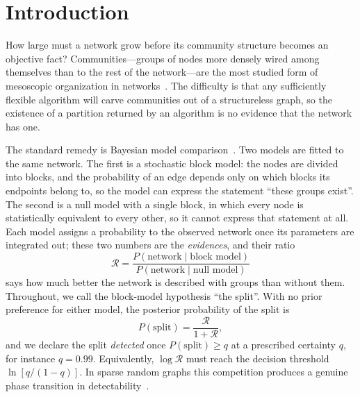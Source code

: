 \documentclass[preprint,12pt]{elsarticle}
\newcommand{\Rev}{\mathcal{R}}
\newcommand{\logR}{\log \Rev}
\begin{document}
\section{Introduction}
\label{sec:intro}

How large must a network grow before its community structure becomes an
objective fact? Communities---groups of nodes more densely wired among
themselves than to the rest of the network---are the most studied form of
mesoscopic organization in networks~\cite{fortunato2010,fortunato2016}. The
difficulty is that any sufficiently flexible algorithm will carve communities
out of a structureless graph, so the existence of a partition
returned by an algorithm is no evidence that the network has one.

The standard remedy is Bayesian model comparison~\cite{holland1983,karrer2011,
peixoto2017}. Two models are fitted to the same network. The first is a
stochastic block model: the nodes are divided into blocks, and the probability
of an edge depends only on which blocks its endpoints belong to, so the model
can express the statement ``these groups exist''. The second is a null model
with a single block, in which every node is statistically equivalent to every
other, so it cannot express that statement at all. Each model assigns a
probability to the observed network once its parameters are integrated out;
these two numbers are the \emph{evidences}, and their ratio
\begin{equation}
  \Rev = \frac{P(\text{network} \mid \text{block model})}
              {P(\text{network} \mid \text{null model})}
  \label{eq:R}
\end{equation}
says how much better the network is described with groups than without them.
Throughout, we call the block-model hypothesis ``the split''. With no prior
preference for either model, the posterior probability of the split is
\begin{equation}
  P(\text{split}) = \frac{\Rev}{1+\Rev},
  \label{eq:Psplit}
\end{equation}
and we declare the split \emph{detected} once $P(\text{split})\ge q$ at a
prescribed certainty $q$, for instance $q=0.99$. Equivalently, $\logR$ must
reach the decision threshold $\ln[q/(1-q)]$. In sparse random graphs this
competition produces a genuine phase transition in
detectability~\cite{decelle2011}.
\end{document}
